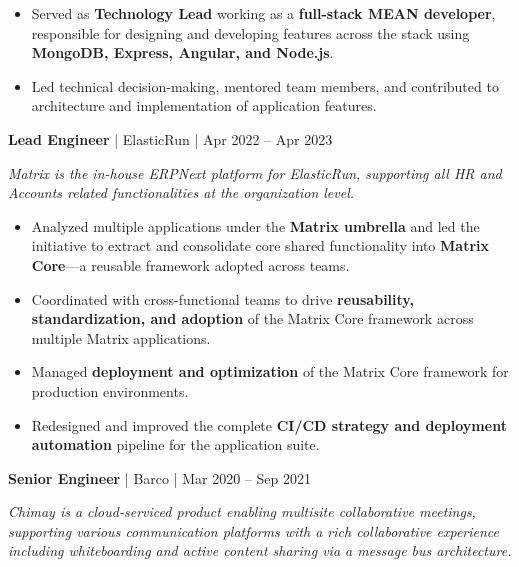 \documentclass[a4paper,11pt]{article}
\newcommand{\jobtitle}[4]{
  \vspace{6pt}
  {\textbf{\textcolor{accent}{#1}} | #2 | #3}
  \vspace{2pt}
}
\begin{document}
\begin{itemize}[leftmargin=*, nosep]
  \item Served as \textbf{Technology Lead} working as a \textbf{full-stack MEAN developer}, responsible for designing and developing features across the stack using \textbf{MongoDB, Express, Angular, and Node.js}.
  \item Led technical decision-making, mentored team members, and contributed to architecture and implementation of application features.
\end{itemize}

\vspace{8pt}
\jobtitle{Lead Engineer}{ElasticRun}{Apr 2022 -- Apr 2023}{}

\textit{Matrix is the in-house ERPNext platform for ElasticRun, supporting all HR and Accounts related functionalities at the organization level.}

\begin{itemize}[leftmargin=*, nosep]
  \item Analyzed multiple applications under the \textbf{Matrix umbrella} and led the initiative to extract and consolidate core shared functionality into \textbf{Matrix Core}---a reusable framework adopted across teams.
  \item Coordinated with cross-functional teams to drive \textbf{reusability, standardization, and adoption} of the Matrix Core framework across multiple Matrix applications.
  \item Managed \textbf{deployment and optimization} of the Matrix Core framework for production environments.
  \item Redesigned and improved the complete \textbf{CI/CD strategy and deployment automation} pipeline for the application suite.
\end{itemize}

\vspace{8pt}
\jobtitle{Senior Engineer}{Barco}{Mar 2020 -- Sep 2021}{}

\textit{Chimay is a cloud-serviced product enabling multisite collaborative meetings, supporting various communication platforms with a rich collaborative experience including whiteboarding and active content sharing via a message bus architecture.}
\end{document}
